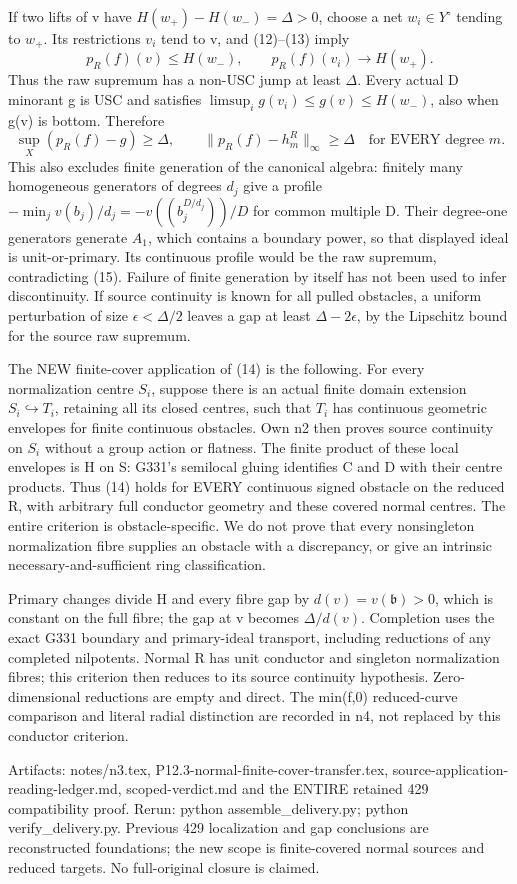 If two lifts of v have $H(w_+)-H(w_-)=\Delta>0$, choose a net
$w_i\in Y^\circ$ tending to $w_+$. Its restrictions $v_i$ tend to v,
and (12)--(13) imply
\[
 p_R(f)(v)\le H(w_-),\qquad p_R(f)(v_i)\longrightarrow H(w_+).
\]
Thus the raw supremum has a non-USC jump at least $\Delta$.
Every actual D minorant g is USC and satisfies
$\limsup_i g(v_i)\le g(v)\le H(w_-)$, also when g(v) is bottom.
Therefore
\[
       \sup_X(p_R(f)-g)\ge\Delta,
       \qquad \|p_R(f)-h_m^R\|_\infty\ge\Delta
       \quad\text{for EVERY degree }m.                     \tag{15}
\]
This also excludes finite generation of the canonical algebra: finitely
many homogeneous generators of degrees $d_j$ give a profile
$-\min_j v(b_j)/d_j=-v((b_j^{D/d_j}))/D$ for common multiple D.
Their degree-one generators generate $A_1$, which contains a boundary
power, so that displayed ideal is unit-or-primary. Its continuous profile
would be the raw supremum, contradicting (15). Failure of finite
generation by itself has not been used to infer discontinuity.
If source continuity is known for all pulled obstacles, a uniform
perturbation of size $\epsilon<\Delta/2$ leaves a gap at least
$\Delta-2\epsilon$, by the Lipschitz bound for the source raw supremum.

The NEW finite-cover application of (14) is the following. For every
normalization centre $S_i$, suppose there is an actual finite domain
extension $S_i\hookrightarrow T_i$, retaining all its closed centres,
such that $T_i$ has continuous geometric envelopes for finite continuous
obstacles. Own n2 then proves source continuity on $S_i$ without a group
action or flatness. The finite product of these local envelopes is H on S:
G331's semilocal gluing identifies C and D with their centre products.
Thus (14) holds for EVERY continuous signed obstacle on the reduced R,
with arbitrary full conductor geometry and these covered normal centres.
The entire criterion is obstacle-specific. We do not prove that every
nonsingleton normalization fibre supplies an obstacle with a discrepancy,
or give an intrinsic necessary-and-sufficient ring classification.

Primary changes divide H and every fibre gap by
$d(v)=v(\mathfrak b)>0$, which is constant on the full fibre;
the gap at v becomes $\Delta/d(v)$. Completion uses the exact G331
boundary and primary-ideal transport, including reductions of any
completed nilpotents. Normal R has unit conductor and singleton
normalization fibres; this criterion then reduces to its source
continuity hypothesis. Zero-dimensional reductions are empty and direct.
The min(f,0) reduced-curve comparison and literal radial distinction are
recorded in n4, not replaced by this conductor criterion.

Artifacts: notes/n3.tex, P12.3-normal-finite-cover-transfer.tex,
source-application-reading-ledger.md, scoped-verdict.md and the ENTIRE
retained 429 compatibility proof. Rerun: python assemble\_delivery.py;
python verify\_delivery.py. Previous 429 localization and gap conclusions
are reconstructed foundations; the new scope is finite-covered normal
sources and reduced targets. No full-original closure is claimed.
